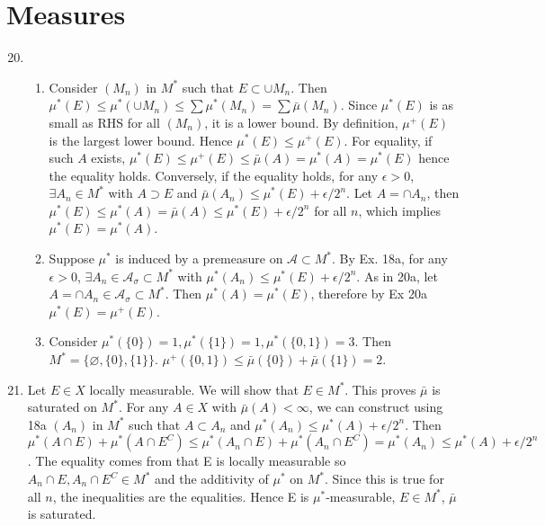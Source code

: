 \documentclass{book}
\begin{document}
\chapter{Measures}



\begin{enumerate}[label=\arabic*.,font=\bfseries]
	\setcounter{enumi}{19}
	\item \begin{enumerate}
		      \item Consider $(M_n)$ in $M^*$ such that $E \subset \cup M_n$. Then $\mu^*(E) \le \mu^*(\cup M_n) \le \sum \mu^*(M_n) = \sum \bar\mu(M_n)$. Since $\mu^*(E)$ is as small as RHS for all $(M_n)$, it is a lower bound. By definition, $\mu^+(E)$ is the largest lower bound. Hence $\mu^*(E)\le\mu^+(E)$.
		            For equality, if such $A$ exists, $\mu^*(E)\le\mu^+(E)\le\bar\mu(A)=\mu^*(A)=\mu^*(E)$ hence the equality holds. Conversely, if the equality holds, for any $\epsilon>0$, $\exists A_n\in M^*$ with $A\supset E$ and $\bar\mu(A_n)\le\mu^*(E)+\epsilon/2^n$. Let $A=\cap A_n$, then $\mu^*(E)\le\mu^*(A)=\bar\mu(A)\le\mu^*(E)+\epsilon/2^n$ for all $n$, which implies $\mu^*(E)=\mu^*(A)$.
		      \item Suppose $\mu^*$ is induced by a premeasure on $\mathcal A \subset M^*$. By Ex. 18a, for any $\epsilon>0$, $\exists A_n \in \mathcal A_\sigma \subset M^*$ with $\mu^*(A_n) \le \mu^*(E)+\epsilon/2^n$. As in 20a, let $A=\cap A_n \in \mathcal A_\sigma \subset M^*$. Then $\mu^*(A)=\mu^*(E)$, therefore by Ex 20a $\mu^*(E)=\mu^+(E)$.
		      \item Consider $\mu^*(\{0\})=1, \mu^*(\{1\})=1, \mu^*(\{0,1\})=3$. Then $M^*=\{\varnothing, \{0\}, \{1\}\}$. $\mu^+(\{0,1\}) \le \bar\mu(\{0\})+\bar\mu(\{1\})=2$.
	      \end{enumerate}

	\item Let $E\in X$ locally measurable. We will show that $E\in M^*$. This proves $\bar\mu$ is saturated on $M^*$. For any $A\in X$ with $\bar\mu(A)<\infty$, we can construct using 18a $(A_n)$ in $M^*$ such that $A\subset A_n$ and $\mu^*(A_n)\le\mu^*(A)+\epsilon/2^n$. Then $\mu^*(A\cap E)+\mu^*(A\cap E^C)\le\mu^*(A_n\cap E)+\mu^*(A_n\cap E^C)=\mu^*(A_n)\le\mu^*(A)+\epsilon/2^n$. The equality comes from that E is locally measurable so $A_n\cap E, A_n\cap E^C \in M^*$ and the additivity of $\mu^*$ on $M^*$. Since this is true for all $n$, the inequalities are the equalities. Hence E is $\mu^*$-measurable, $E\in M^*$, $\bar\mu$ is saturated.


\end{enumerate}
\end{document}
